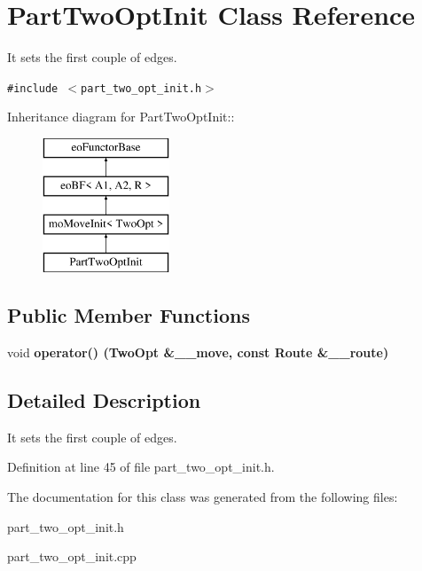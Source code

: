 \section{Part\-Two\-Opt\-Init Class Reference}
\label{class_part_two_opt_init}
It sets the first couple of edges.  


{\tt \#include $<$part\_\-two\_\-opt\_\-init.h$>$}

Inheritance diagram for Part\-Two\-Opt\-Init::\begin{figure}[H]
\begin{center}
\leavevmode
\includegraphics[height=4cm]{class_part_two_opt_init}
\end{center}
\end{figure}
\subsection*{Public Member Functions}
\begin{CompactItemize}
\item 
void \bf{operator()} (\bf{Two\-Opt} \&\_\-\_\-move, const \bf{Route} \&\_\-\_\-route)\label{class_part_two_opt_init_2f6190b1700ca1a12d0baaceaf75383c}

\end{CompactItemize}


\subsection{Detailed Description}
It sets the first couple of edges. 



Definition at line 45 of file part\_\-two\_\-opt\_\-init.h.

The documentation for this class was generated from the following files:\begin{CompactItemize}
\item 
part\_\-two\_\-opt\_\-init.h\item 
part\_\-two\_\-opt\_\-init.cpp\end{CompactItemize}
